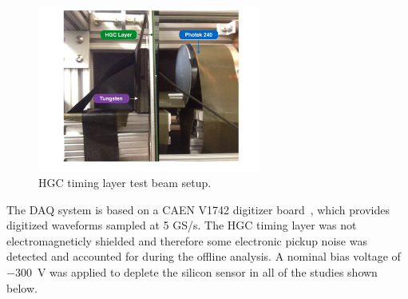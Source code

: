 \begin{figure}[h] 
\centering
\includegraphics[width=0.65\textwidth]{HGC/HGC_SETUP.pdf} 
\caption{HGC timing layer test beam setup.} 
\label{hgc:BeamPhotoDiagram} 
\end{figure}
The DAQ system is based on a CAEN V1742 digitizer board~\cite{CAENDRS}, which
provides digitized waveforms sampled at 5 GS/s. The HGC timing layer
was not electromagneticly shielded and therefore some electronic
pickup noise was detected and accounted for during the offline
analysis. A nominal bias voltage of $-300$~V was applied to deplete the silicon sensor in all of the studies shown below.

